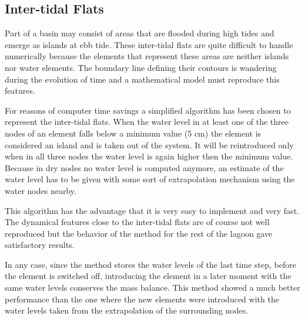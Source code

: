 \subsection{Inter-tidal Flats}

Part of a basin may consist of areas that are
flooded during high tides and emerge as islands at ebb tide. These
inter-tidal flats are quite difficult to handle numerically because
the elements that represent these areas are neither
islands nor water elements. The boundary line defining their
contours is wandering during the evolution
of time and a mathematical model must reproduce this features.

For reasons of computer time savings a simplified algorithm has been chosen
to represent the inter-tidal flats. When the water level in at least
one of the three nodes of an element falls below a minimum value (5 cm)
the element is considered an island and is taken out of the system.
It will be reintroduced only when in all three
nodes the water level is again higher then the minimum value.
Because in dry nodes no water level is computed anymore, an estimate
of the water level has to be given with some sort of extrapolation mechanism
using the water nodes nearby.

This algorithm has the advantage that it is very easy to
implement and very fast. The dynamical features close to the
inter-tidal flats are of course not well reproduced but the
behavior of the method for the rest of the lagoon
gave satisfactory results.

In any case, since the method stores the water levels of the
last time step, before the element is switched off, introducing the
element in a later moment with the same water levels conserves the
mass balance. This method showed a much better performance
than the one where the new elements were introduced with the water
levels taken from the extrapolation of the surrounding nodes.



